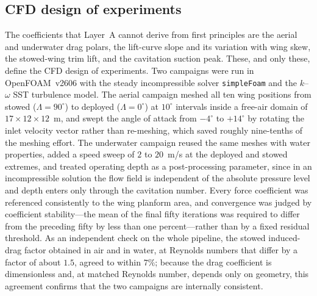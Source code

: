 \documentclass[conf]{new-aiaa}
\begin{document}
\subsection{CFD design of experiments}
The coefficients that Layer~A cannot derive from first principles are the aerial and underwater drag
polars, the lift-curve slope and its variation with wing skew, the stowed-wing trim lift, and the
cavitation suction peak. These, and only these, define the CFD design of experiments. Two campaigns
were run in OpenFOAM~v2606 with the steady incompressible solver \texttt{simpleFoam} and the
$k$--$\omega$ SST turbulence model. The aerial campaign meshed all ten wing positions from stowed
($\Lambda=90^\circ$) to deployed ($\Lambda=0^\circ$) at $10^\circ$ intervals inside a free-air domain
of $17\times12\times12$~m, and swept the angle of attack from $-4^\circ$ to $+14^\circ$ by rotating
the inlet velocity vector rather than re-meshing, which saved roughly nine-tenths of the meshing
effort. The underwater campaign reused the same meshes with water properties, added a speed sweep of
$2$ to $20$~m/s at the deployed and stowed extremes, and treated operating depth as a
post-processing parameter, since in an incompressible solution the flow field is independent of the
absolute pressure level and depth enters only through the cavitation number. Every force coefficient
was referenced consistently to the wing planform area, and convergence was judged by coefficient
stability---the mean of the final fifty iterations was required to differ from the preceding fifty by
less than one percent---rather than by a fixed residual threshold. As an independent check on the
whole pipeline, the stowed induced-drag factor obtained in air and in water, at Reynolds numbers that
differ by a factor of about $1.5$, agreed to within $7\%$; because the drag coefficient is
dimensionless and, at matched Reynolds number, depends only on geometry, this agreement confirms that
the two campaigns are internally consistent.
\end{document}
